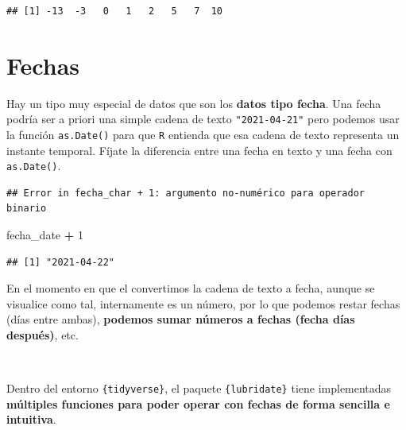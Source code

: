\documentclass[11pt,]{book}
\newenvironment{Shaded}{\begin{snugshade}}{\end{snugshade}}
\newcommand{\DataTypeTok}[1]{\textcolor[rgb]{0.27,0.27,0.27}{#1}}
\newcommand{\DecValTok}[1]{\textcolor[rgb]{0.06,0.06,0.06}{#1}}
\newcommand{\KeywordTok}[1]{\textcolor[rgb]{0.27,0.27,0.27}{\textbf{#1}}}
\newcommand{\NormalTok}[1]{#1}
\newcommand{\OperatorTok}[1]{\textcolor[rgb]{0.43,0.43,0.43}{\textbf{#1}}}
\newcommand{\StringTok}[1]{\textcolor[rgb]{0.5,0.5,0.5}{#1}}
\begin{document}
\begin{verbatim}
## [1] -13  -3   0   1   2   5   7  10
\end{verbatim}

\hypertarget{fechas}{%
\section{Fechas}\label{fechas}}

Hay un tipo muy especial de datos que son los \textbf{datos tipo fecha}. Una fecha podría ser a priori una simple cadena de texto \texttt{"2021-04-21"} pero podemos usar la función \texttt{as.Date()} para que \texttt{R} entienda que esa cadena de texto representa un instante temporal. Fíjate la diferencia entre una fecha en texto y una fecha con \texttt{as.Date()}.

\begin{Shaded}
\end{Shaded}

\begin{verbatim}
## Error in fecha_char + 1: argumento no-numérico para operador binario
\end{verbatim}

\begin{Shaded}
\begin{Highlighting}[]
\NormalTok{fecha_date }\OperatorTok{+}\StringTok{ }\DecValTok{1}
\end{Highlighting}
\end{Shaded}

\begin{verbatim}
## [1] "2021-04-22"
\end{verbatim}

En el momento en que el convertimos la cadena de texto a fecha, aunque se visualice como tal, internamente es un número, por lo que podemos restar fechas (días entre ambas), \textbf{podemos sumar números a fechas (fecha días después)}, etc.

~

Dentro del entorno \texttt{\{tidyverse\}}, el paquete \texttt{\{lubridate\}} tiene implementadas \textbf{múltiples funciones para poder operar con fechas de forma sencilla e intuitiva}.
\end{document}
